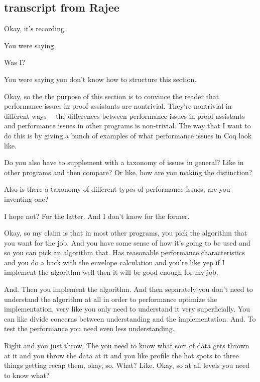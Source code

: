 \begin{subappendices}
    \section{transcript from Rajee}
    
    
    Okay, it's recording. 
    
    You were saying.
    
    Was I?
    
    You were saying you don't know how to structure this section.
    
    Okay, so the the purpose of this section is to convince the reader that performance issues in proof assistants are nontrivial.  They're nontrivial in different ways----the differences between performance issues in proof assistants and performance issues in other programs is non-trivial. The way that I want to do this is by giving a bunch of examples of what performance issues in Coq look like.
    
    Do you also have to supplement with a taxonomy of issues in general? Like in other programs and then compare? Or like, how are you making the distinction? 
    
    Also is there a taxonomy of different types of performance issues, are you inventing one?
    
    I hope not? For the latter. And I don't know for the former.
    
    Okay, so my claim is that in most other programs, you pick the algorithm that you want for the job. And you have some sense of how it's going to be used and so you can pick an algorithm that. Has reasonable performance characteristics and you do a back with the envelope calculation and you're like yep if I implement the algorithm well then it will be good enough for my job. 
    
    And. Then you implement the algorithm. And then separately you don't need to understand the algorithm at all in order to performance optimize the implementation, very like you only need to understand it very superficially. You can like divide concerns between understanding and the implementation. And. To test the performance you need even less understanding. 
    
    Right and you just throw. The you need to know what sort of data gets thrown at it and you throw the data at it and you like profile the hot spots to three things getting recap them, okay, so. What? Like. Okay, so at all levels you need to know what? 
    

\end{subappendices}
